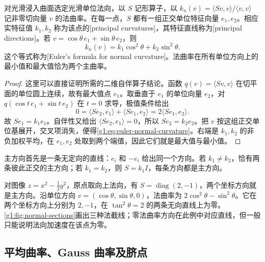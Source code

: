 \begin{theorem}\label{g1:thm:euler-normal-curvature}
	对光滑浸入曲面选定光滑单位法向，以 \(S\) 记形算子，以 \(k_n(v)=\langle Sv,v\rangle/\langle v,v\rangle\) 记非零切向量 \(v\) 的法曲率。在每一点，\(S\) 都有一组正交单位特征向量 \(e_1,e_2\)。相应实特征值 \(k_1,k_2\) 称为该点的[principal curvatures]，其特征直线称为[principal directions]。若 \(v=\cos\theta\,e_1+\sin\theta\,e_2\)，则
	\begin{equation}\label{g1:eq:euler-normal-curvature}
		k_n(v)=k_1\cos^2\theta+k_2\sin^2\theta.
	\end{equation}
	这个等式称为[Euler's formula for normal curvature]。法曲率在所有单位方向上的最小值和最大值恰为两个主曲率。
\end{theorem}
\begin{proof}
	这里可以直接证明所需的二维自伴算子结论。函数 \(q(v)=\langle Sv,v\rangle\) 在切平面的单位圆上连续，故有最大值点 \(e_1\)。取垂直于 \(e_1\) 的单位向量 \(e_2\)，对 \(q(\cos t\,e_1+\sin t\,e_2)\) 在 \(t=0\) 求导，极值条件给出
	\[
		0=\langle Se_2,e_1\rangle+\langle Se_1,e_2\rangle=2\langle Se_1,e_2\rangle.
	\]
	故 \(Se_1=k_1e_1\)。自伴性又给出 \(\langle Se_2,e_1\rangle=0\)，所以 \(Se_2=k_2e_2\)。把 \(v\) 按这组正交单位基展开，交叉项消失，便得\eqref{g1:eq:euler-normal-curvature}。右端是 \(k_1,k_2\) 的非负加权平均，在 \(e_1,e_2\) 处取到两个端值，因此它们就是最大值与最小值。
\end{proof}

主方向首先是一条无定向的直线：\(e_i\) 和 \(-e_i\) 给出同一个方向。若 \(k_1\ne k_2\)，恰有两条彼此正交的主方向；若 \(k_1=k_2\)，则 \(S=k_1I\)，每条方向都是主方向。

\begin{example}\label{g1:exm:saddle-normal-curvature}
	对图像 \(z=x^2-\tfrac12y^2\)，原点取向上法向，有 \(S=\operatorname{diag}(2,-1)\)，两个坐标方向就是主方向。沿单位方向 \(v=(\cos\theta,\sin\theta,0)\)，法曲率为 \(2\cos^2\theta-\sin^2\theta\)。它在两个坐标方向上分别为 \(2,-1\)，在 \(\tan^2\theta=2\) 的两条无向直线上为零。\cref{g1:fig:normal-sections}画出三种法截线；零法曲率方向在此例中对应直线，但一般只能说明法向加速度在该点为零。
\end{example}



\subsection{平均曲率、Gauss 曲率及脐点}
\label{g1:subsec:0802:03}

